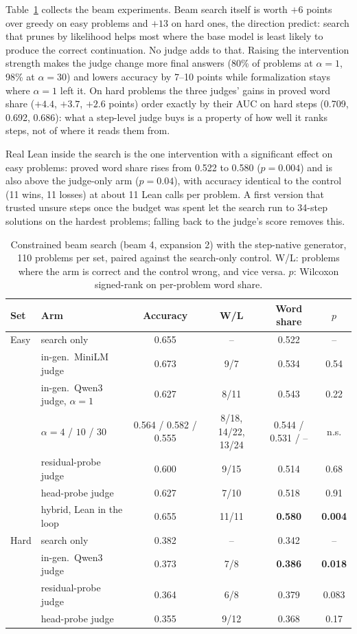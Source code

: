 \documentclass[10pt]{article}
\begin{document}
Table~\ref{tab:decode} collects the beam experiments. Beam search itself is worth $+6$ points over greedy on easy problems and $+13$ on hard ones, the direction \citet{he2026provable} predict: search that prunes by likelihood helps most where the base model is least likely to produce the correct continuation. No judge adds to that. Raising the intervention strength makes the judge change more final answers (80\% of problems at $\alpha=1$, 98\% at $\alpha=30$) and lowers accuracy by 7--10 points while formalization stays where $\alpha=1$ left it. On hard problems the three judges' gains in proved word share ($+4.4$, $+3.7$, $+2.6$ points) order exactly by their AUC on hard steps (0.709, 0.692, 0.686): what a step-level judge buys is a property of how well it ranks steps, not of where it reads them from.

Real Lean inside the search is the one intervention with a significant effect on easy problems: proved word share rises from 0.522 to 0.580 ($p=0.004$) and is also above the judge-only arm ($p=0.04$), with accuracy identical to the control (11 wins, 11 losses) at about 11 Lean calls per problem. A first version that trusted unsure steps once the budget was spent let the search run to 34-step solutions on the hardest problems; falling back to the judge's score removes this.

\begin{table}[t]
\caption{Constrained beam search (beam 4, expansion 2) with the step-native generator, 110 problems per set, paired against the search-only control. W/L: problems where the arm is correct and the control wrong, and vice versa. $p$: Wilcoxon signed-rank on per-problem word share.}\label{tab:decode}
\centering\small
\begin{tabular}{llcccc}
\toprule
Set & Arm & Accuracy & W/L & Word share & $p$\\
\midrule
Easy & search only & 0.655 & -- & 0.522 & --\\
 & in-gen.\ MiniLM judge & 0.673 & 9/7 & 0.534 & 0.54\\
 & in-gen.\ Qwen3 judge, $\alpha=1$ & 0.627 & 8/11 & 0.543 & 0.22\\
 & \quad $\alpha=4$ / $10$ / $30$ & 0.564 / 0.582 / 0.555 & 8/18, 14/22, 13/24 & 0.544 / 0.531 / -- & n.s.\\
 & residual-probe judge & 0.600 & 9/15 & 0.514 & 0.68\\
 & head-probe judge & 0.627 & 7/10 & 0.518 & 0.91\\
 & hybrid, Lean in the loop & 0.655 & 11/11 & \textbf{0.580} & \textbf{0.004}\\
\midrule
Hard & search only & 0.382 & -- & 0.342 & --\\
 & in-gen.\ Qwen3 judge & 0.373 & 7/8 & \textbf{0.386} & \textbf{0.018}\\
 & residual-probe judge & 0.364 & 6/8 & 0.379 & 0.083\\
 & head-probe judge & 0.355 & 9/12 & 0.368 & 0.17\\
\bottomrule
\end{tabular}
\end{table}
\end{document}
